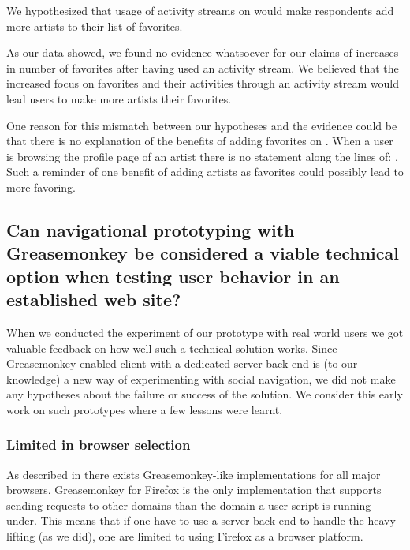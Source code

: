 We hypothesized that usage of activity streams on \urort{} would
make respondents add more artists to their list of favorites.

As our data%
showed, we found no evidence whatsoever for our claims of increases in
number of favorites after having used an activity stream.
We believed that the increased focus on favorites and their activities through
an activity stream would lead users to make more artists their favorites.

One reason for this mismatch between our hypotheses and the evidence could be
that there is no explanation of the benefits of adding favorites on \urort{}.
When a user is browsing the profile page of an artist there is no statement
along the lines of: . Such a reminder of one benefit of adding
artists as favorites could possibly lead to more favoring.

\subsection{%
  Can navigational prototyping with Greasemonkey be considered a
  viable technical option when testing user behavior in an
  established web site?
}

When we conducted the experiment of our prototype with real world users
we got valuable feedback on how well such a technical solution works.
Since Greasemonkey enabled client with a dedicated server back-end is (to our
knowledge) a new way of experimenting with social navigation, we did not
make any hypotheses about the failure or success of the solution.
We consider this early work on such prototypes where a few lessons
were learnt.

\subsubsection{Limited in browser selection}

As described in
 there exists Greasemonkey-like
implementations for all major browsers. Greasemonkey for Firefox is the only
implementation that supports sending requests to other domains than the domain
a user-script is running under. This means that if one have to use a server
back-end to handle the heavy lifting (as we did), one are limited to
using Firefox as a browser platform.%

